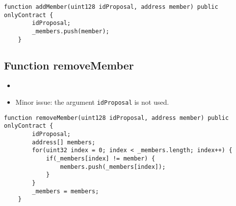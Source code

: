 \begin{lstlisting}[firstnumber=25]
    function addMember(uint128 idProposal, address member) public onlyContract {
        idProposal;
        _members.push(member);
    }
\end{lstlisting}

\subsection{Function removeMember}

\begin{itemize}
\item {}
\item Minor issue: the argument {\tt idProposal} is not used.
\end{itemize}

\begin{lstlisting}[firstnumber=30]
    function removeMember(uint128 idProposal, address member) public onlyContract {
        idProposal;
        address[] members;
        for(uint32 index = 0; index < _members.length; index++) {
            if(_members[index] != member) {
                members.push(_members[index]);
            }
        }
        _members = members;
    }
\end{lstlisting}
